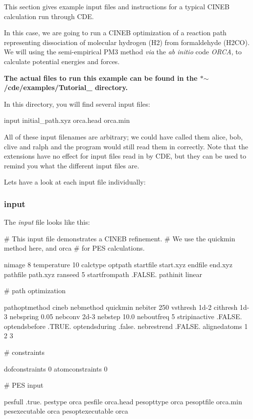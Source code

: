 This section gives example input files and instructions for a typical C\+I\+N\+EB calculation run through C\+DE.

In this case, we are going to run a C\+I\+N\+EB optimization of a reaction path representing dissociation of molecular hydrogen (H2) from formaldehyde (H2\+CO). We will using the semi-\/empirical P\+M3 method {\itshape via} the {\itshape ab initio} code {\itshape O\+R\+CA}, to calculate potential energies and forces.

{\bfseries The actual files to run this example can be found in the $\ast$$\sim$/cde/examples/\+Tutorial\+\_ directory.}

In this directory, you will find several input files\+: \begin{DoxyVerb}  input
  initial_path.xyz
  orca.head
  orca.min
\end{DoxyVerb}


All of these input filenames are arbitrary; we could have called them alice, bob, clive and ralph and the program would still read them in correctly. Note that the extensions have no effect for input files read in by C\+DE, but they can be used to remind you what the different input files are.

Let\textquotesingle{}s have a look at each input file individually\+:

\subsubsection*{input}

The {\itshape input} file looks like this\+: \begin{DoxyVerb}# This input file demonstrates a CINEB refinement.
# We use the quickmin method here, and orca
# for PES calculations.

nimage 8
temperature 10
calctype optpath
startfile start.xyz
endfile end.xyz
pathfile path.xyz
ranseed  5
startfrompath  .FALSE.
pathinit  linear

# path optimization

pathoptmethod cineb
nebmethod quickmin
nebiter 250
vsthresh 1d-2
cithresh 1d-3
nebspring 0.05
nebconv 2d-3
nebstep  10.0
neboutfreq 5
stripinactive .FALSE.
optendsbefore .TRUE.
optendsduring .false.
nebrestrend .FALSE.
alignedatoms
1 2 3

# constraints

dofconstraints 0
atomconstraints 0

# PES input

pesfull .true.
pestype  orca
pesfile   orca.head
pesopttype  orca
pesoptfile orca.min
pesexecutable orca
pesoptexecutable orca
\end{DoxyVerb}


